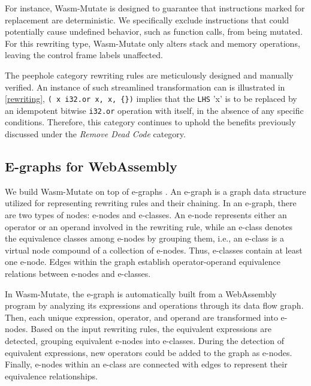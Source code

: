 \documentclass[a4paper,fleqn]{cas-dc}
\newcommand*\badge[1]{ \colorbox{red}{\color{white}#1}}
\newcommand{\tool}{{\sc Wasm-Mutate}\xspace}
\newcommand{\todo}[1]{%
\refstepcounter{todo}
\noindent\textbf{\badge{TODO}} {\color{red}#1}
\addcontentsline{td}{todo}
{\color{red}\thesection.\thetodo\xspace #1}}
\begin{document}
For instance, \tool is designed to guarantee that instructions marked for replacement are deterministic. 
We specifically exclude instructions that could potentially cause undefined behavior, such as function calls, from being mutated. 
For this rewriting type, \tool only alters stack and memory operations, leaving the control frame labels unaffected.

The peephole category rewriting rules are meticulously designed and manually verified. 
An instance of such streamlined transformation can is illustrated in \autoref{rewriting}, \texttt{(\ x\ i32.or\ x, x, \{\})} implies that the \texttt{LHS} 'x' is to be replaced by an idempotent bitwise \texttt{i32.or} operation with itself, in the absence of any specific conditions.
Therefore, this category continues to uphold the benefits previously discussed under the \emph{Remove Dead Code} category.


\subsection{E-graphs for WebAssembly}
\label{alg}

We build \tool on top of e-graphs \cite{10.1145/3571207}.
An e-graph is a graph data structure utilized for representing rewriting rules and their chaining. 
In an e-graph, there are two types of nodes: e-nodes and e-classes. 
An e-node represents either an operator or an operand involved in the rewriting rule, while an e-class denotes the equivalence classes among e-nodes by grouping them, i.e., an e-class is a virtual node compound of a collection of e-nodes. 
Thus, e-classes contain at least one e-node.
Edges within the graph establish operator-operand equivalence relations between e-nodes and e-classes.

In \tool, the e-graph is automatically built from a WebAssembly program by analyzing its expressions and operations through its data flow graph.
Then, each unique expression, operator, and operand are transformed into e-nodes.
Based on the input rewriting rules, the equivalent expressions are detected, grouping equivalent e-nodes into e-classes.
During the detection of equivalent expressions, new operators could be added to the graph as e-nodes.
Finally, e-nodes within an e-class are connected with edges to represent their equivalence relationships.
\end{document}
